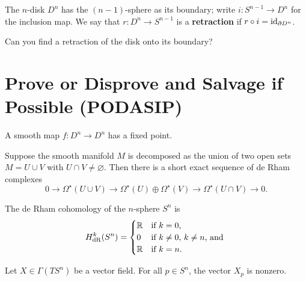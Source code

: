 \documentclass{homework}
\begin{document}
\begin{problem}\label{no-retraction}The $n$-disk $D^n$ has the $(n-1)$-sphere as its
boundary; write $i : S^{n-1} \to D^n$ for the inclusion map.  We say
that $r : D^n \to S^{n-1}$ is a \textbf{retraction} if $r \circ i =
\operatorname{id}_{\partial D^n}$.

Can you find a retraction of the disk onto its boundary?
\end{problem}

\section{Prove or Disprove and Salvage if Possible (PODASIP)}

\begin{problem}
 A smooth map $f : D^n \to D^n$ has a fixed point. 
\end{problem}


\begin{problem}
  Suppose the smooth manifold $M$ is decomposed as the union of two open sets $M = U \cup V$ with $U \cap V \neq \varnothing$.  Then there is a short exact sequence of de Rham complexes
  \[
    0 \longrightarrow \Omega^\star(U \cup V) \longrightarrow \Omega^\star(U) \oplus \Omega^\star(V) \longrightarrow \Omega^\star(U \cap V) \longrightarrow 0.
 \]
\end{problem}

\begin{problem}
  The de Rham cohomology of the $n$-sphere $S^n$ is
  \[
    H_{\operatorname{dR}}^k(S^n) = \begin{cases}
      \mathbb{R} & \mbox{if $k = 0$,} \\
      0 & \mbox{if $k \neq 0, \, k \neq n$, and }\\
      \mathbb{R} & \mbox{if $k = n$.}
      \end{cases}
  \]
\end{problem}

\begin{problem}
  Let $X \in \Gamma(TS^n)$ be a vector field.  For all $p \in S^n$, the vector $X_p$ is nonzero. 
\end{problem}
\end{document}
